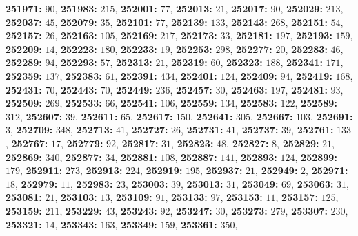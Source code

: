 \textsf{\bfseries 251971:} $90$, \textsf{\bfseries 251983:} $215$, \textsf{\bfseries 252001:} $77$, \textsf{\bfseries 252013:} $21$, \textsf{\bfseries 252017:} $90$, \textsf{\bfseries 252029:} $213$, \textsf{\bfseries 252037:} $45$, \textsf{\bfseries 252079:} $35$, \textsf{\bfseries 252101:} $77$, \textsf{\bfseries 252139:} $133$, \textsf{\bfseries 252143:} $268$, \textsf{\bfseries 252151:} $54$, \textsf{\bfseries 252157:} $26$, \textsf{\bfseries 252163:} $105$, \textsf{\bfseries 252169:} $217$, \textsf{\bfseries 252173:} $33$, \textsf{\bfseries 252181:} $197$, \textsf{\bfseries 252193:} $159$, \textsf{\bfseries 252209:} $14$, \textsf{\bfseries 252223:} $180$, \textsf{\bfseries 252233:} $19$, \textsf{\bfseries 252253:} $298$, \textsf{\bfseries 252277:} $20$, \textsf{\bfseries 252283:} $46$, \textsf{\bfseries 252289:} $94$, \textsf{\bfseries 252293:} $57$, \textsf{\bfseries 252313:} $21$, \textsf{\bfseries 252319:} $60$, \textsf{\bfseries 252323:} $188$, \textsf{\bfseries 252341:} $171$, \textsf{\bfseries 252359:} $137$, \textsf{\bfseries 252383:} $61$, \textsf{\bfseries 252391:} $434$, \textsf{\bfseries 252401:} $124$, \textsf{\bfseries 252409:} $94$, \textsf{\bfseries 252419:} $168$, \textsf{\bfseries 252431:} $70$, \textsf{\bfseries 252443:} $70$, \textsf{\bfseries 252449:} $236$, \textsf{\bfseries 252457:} $30$, \textsf{\bfseries 252463:} $197$, \textsf{\bfseries 252481:} $93$, \textsf{\bfseries 252509:} $269$, \textsf{\bfseries 252533:} $66$, \textsf{\bfseries 252541:} $106$, \textsf{\bfseries 252559:} $134$, \textsf{\bfseries 252583:} $122$, \textsf{\bfseries 252589:} $312$, \textsf{\bfseries 252607:} $39$, \textsf{\bfseries 252611:} $65$, \textsf{\bfseries 252617:} $150$, \textsf{\bfseries 252641:} $305$, \textsf{\bfseries 252667:} $103$, \textsf{\bfseries 252691:} $3$, \textsf{\bfseries 252709:} $348$, \textsf{\bfseries 252713:} $41$, \textsf{\bfseries 252727:} $26$, \textsf{\bfseries 252731:} $41$, \textsf{\bfseries 252737:} $39$, \textsf{\bfseries 252761:} $133$, \textsf{\bfseries 252767:} $17$, \textsf{\bfseries 252779:} $92$, \textsf{\bfseries 252817:} $31$, \textsf{\bfseries 252823:} $48$, \textsf{\bfseries 252827:} $8$, \textsf{\bfseries 252829:} $21$, \textsf{\bfseries 252869:} $340$, \textsf{\bfseries 252877:} $34$, \textsf{\bfseries 252881:} $108$, \textsf{\bfseries 252887:} $141$, \textsf{\bfseries 252893:} $124$, \textsf{\bfseries 252899:} $179$, \textsf{\bfseries 252911:} $273$, \textsf{\bfseries 252913:} $224$, \textsf{\bfseries 252919:} $195$, \textsf{\bfseries 252937:} $21$, \textsf{\bfseries 252949:} $2$, \textsf{\bfseries 252971:} $18$, \textsf{\bfseries 252979:} $11$, \textsf{\bfseries 252983:} $23$, \textsf{\bfseries 253003:} $39$, \textsf{\bfseries 253013:} $31$, \textsf{\bfseries 253049:} $69$, \textsf{\bfseries 253063:} $31$, \textsf{\bfseries 253081:} $21$, \textsf{\bfseries 253103:} $13$, \textsf{\bfseries 253109:} $91$, \textsf{\bfseries 253133:} $97$, \textsf{\bfseries 253153:} $11$, \textsf{\bfseries 253157:} $125$, \textsf{\bfseries 253159:} $211$, \textsf{\bfseries 253229:} $43$, \textsf{\bfseries 253243:} $92$, \textsf{\bfseries 253247:} $30$, \textsf{\bfseries 253273:} $279$, \textsf{\bfseries 253307:} $230$, \textsf{\bfseries 253321:} $14$, \textsf{\bfseries 253343:} $163$, \textsf{\bfseries 253349:} $159$, \textsf{\bfseries 253361:} $350$, 
